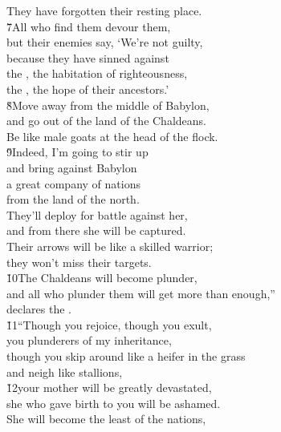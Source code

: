 \begin{poetry}
\poemll    They have forgotten their resting place. \\
\poeml \v{7}All who find them devour them, \\
\poemll    but their enemies say, `We're not guilty, \\
\poeml because they have sinned against \\
\poemll    the , the habitation of righteousness, \\
\poemlll       the , the hope of their ancestors.' \\
\poeml \v{8}Move away from the middle of Babylon, \\
\poemll    and go out of the land of the Chaldeans. \\
\poemlll       Be like male goats at the head of the flock. \\
\poeml \v{9}Indeed, I'm going to stir up \\
\poemll    and bring against Babylon \\
\poeml a great company of nations \\
\poemll    from the land of the north. \\
\poeml They'll deploy for battle against her, \\
\poemll    and from there she will be captured. \\
\poeml Their arrows will be like a skilled warrior; \\
\poemll    they won't miss their targets. \\
\poeml \v{10}The Chaldeans will become plunder, \\
\poemll    and all who plunder them will get more than enough,'' \\
\poemlll       declares the . \\
\poeml \v{11}``Though you rejoice, though you exult, \\
\poemll    you plunderers of my inheritance, \\
\poeml though you skip around like a heifer in the grass \\
\poemll    and neigh like stallions, \\
\poeml \v{12}your mother will be greatly devastated, \\
\poemll    she who gave birth to you will be ashamed. \\
\poeml She will become the least of the nations, \\

\end{poetry}
